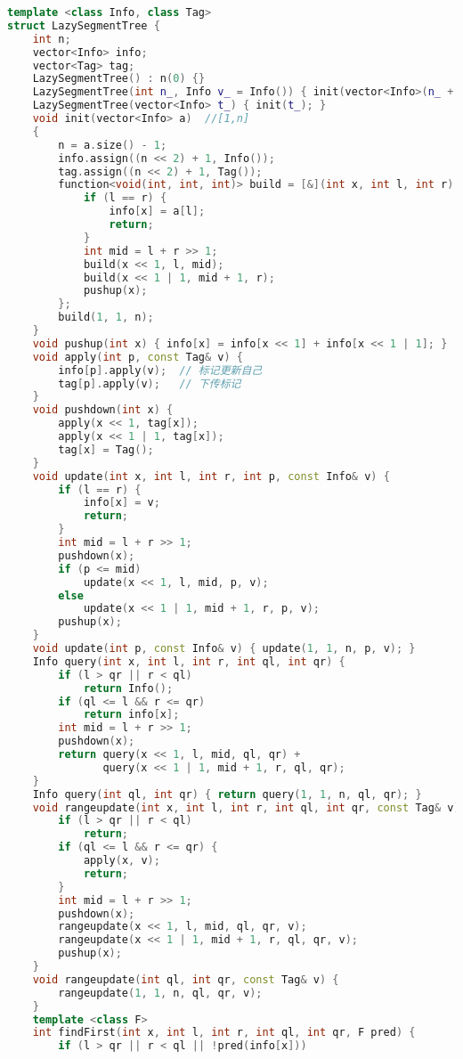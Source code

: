 \begin{lstlisting}[language=C++]
template <class Info, class Tag>
struct LazySegmentTree {
    int n;
    vector<Info> info;
    vector<Tag> tag;
    LazySegmentTree() : n(0) {}
    LazySegmentTree(int n_, Info v_ = Info()) { init(vector<Info>(n_ + 1, v_)); }
    LazySegmentTree(vector<Info> t_) { init(t_); }
    void init(vector<Info> a)  //[1,n]
    {
        n = a.size() - 1;
        info.assign((n << 2) + 1, Info());
        tag.assign((n << 2) + 1, Tag());
        function<void(int, int, int)> build = [&](int x, int l, int r) -> void {
            if (l == r) {
                info[x] = a[l];
                return;
            }
            int mid = l + r >> 1;
            build(x << 1, l, mid);
            build(x << 1 | 1, mid + 1, r);
            pushup(x);
        };
        build(1, 1, n);
    }
    void pushup(int x) { info[x] = info[x << 1] + info[x << 1 | 1]; }
    void apply(int p, const Tag& v) {
        info[p].apply(v);  // 标记更新自己
        tag[p].apply(v);   // 下传标记
    }
    void pushdown(int x) {
        apply(x << 1, tag[x]);
        apply(x << 1 | 1, tag[x]);
        tag[x] = Tag();
    }
    void update(int x, int l, int r, int p, const Info& v) {
        if (l == r) {
            info[x] = v;
            return;
        }
        int mid = l + r >> 1;
        pushdown(x);
        if (p <= mid)
            update(x << 1, l, mid, p, v);
        else
            update(x << 1 | 1, mid + 1, r, p, v);
        pushup(x);
    }
    void update(int p, const Info& v) { update(1, 1, n, p, v); }
    Info query(int x, int l, int r, int ql, int qr) {
        if (l > qr || r < ql)
            return Info();
        if (ql <= l && r <= qr)
            return info[x];
        int mid = l + r >> 1;
        pushdown(x);
        return query(x << 1, l, mid, ql, qr) +
               query(x << 1 | 1, mid + 1, r, ql, qr);
    }
    Info query(int ql, int qr) { return query(1, 1, n, ql, qr); }
    void rangeupdate(int x, int l, int r, int ql, int qr, const Tag& v) {
        if (l > qr || r < ql)
            return;
        if (ql <= l && r <= qr) {
            apply(x, v);
            return;
        }
        int mid = l + r >> 1;
        pushdown(x);
        rangeupdate(x << 1, l, mid, ql, qr, v);
        rangeupdate(x << 1 | 1, mid + 1, r, ql, qr, v);
        pushup(x);
    }
    void rangeupdate(int ql, int qr, const Tag& v) {
        rangeupdate(1, 1, n, ql, qr, v);
    }
    template <class F>
    int findFirst(int x, int l, int r, int ql, int qr, F pred) {
        if (l > qr || r < ql || !pred(info[x]))

\end{lstlisting}
